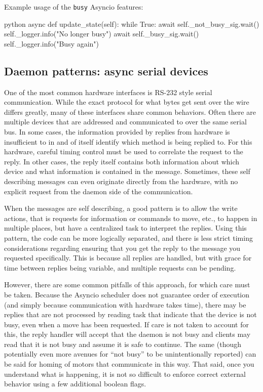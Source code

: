Example usage of the \texttt{busy} Asyncio features:

\begin{codefragment}{python}
async def update_state(self):
    while True:
        await self._not_busy_sig.wait()
        self._logger.info("No longer busy")
        await self._busy_sig.wait()
        self._logger.info("Busy again")
\end{codefragment}

\subsection{Daemon patterns: async serial devices}

One of the most common hardware interfaces is RS-232 style serial communication.
While the exact protocol for what bytes get sent over the wire differs greatly, many of these interfaces share common behaviors.
Often there are multiple devices that are addressed and communicated to over the same serial bus. 
In some cases, the information provided by replies from hardware is insufficient to in and of itself identify which method is being replied to.
For this hardware, careful timing control must be used to correlate the request to the reply.
In other cases, the reply itself contains both information about which device and what information is contained in the message.
Sometimes, these self describing messages can even originate directly from the hardware, with no explicit request from the daemon side of the communication.

When the messages are self describing, a good pattern is to allow the write actions, that is requests for information or commands to move, etc., to happen in multiple places, but have a centralized task to interpret the replies.
Using this pattern, the code can be more logically separated, and there is less strict timing considerations regarding ensuring that you get the reply to the message you requested specifically.
This is because all replies are handled, but with grace for time between replies being variable, and multiple requests can be pending.

However, there are some common pitfalls of this approach, for which care must be taken.
Because the Asyncio scheduler does not guarantee order of execution (and simply because communication with hardware takes time), there may be replies that are not processed by reading task that indicate that the device is not busy, even when a move has been requested.
If care is not taken to account for this, the reply handler will accept that the daemon is not busy and clients may read that it is not busy and assume it is safe to continue.
The same (though potentially even more avenues for ``not busy'' to be unintentionally reported) can be said for homing of motors that communicate in this way.
That said, once you understand what is happening, it is not so difficult to enforce correct external behavior using a few additional boolean flags.


